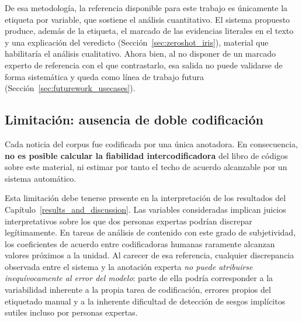 De esa metodología, la referencia disponible para este trabajo es únicamente la
etiqueta por variable, que sostiene el análisis cuantitativo. El sistema propuesto
produce, además de la etiqueta, el marcado de las evidencias literales en el texto
y una explicación del veredicto (Sección~\ref{sec:zeroshot_iris}), material que
habilitaría el análisis cualitativo. Ahora bien, al no disponer de un marcado
experto de referencia con el que contrastarlo, esa salida no puede validarse de
forma sistemática y queda como línea de trabajo futura
(Sección~\ref{sec:futurework_usecases}).

\subsection{Limitación: ausencia de doble codificación}
\label{subsec:limitacion_fiabilidad}

Cada noticia del corpus fue codificada por una única anotadora. En consecuencia,
\textbf{no es posible calcular la fiabilidad intercodificadora} del libro de
códigos sobre este material, ni estimar por tanto el techo de acuerdo alcanzable
por un sistema automático.

Esta limitación debe tenerse presente en la interpretación de los resultados del
Capítulo~\ref{results_and_discussion}. Las variables consideradas implican
juicios interpretativos sobre los que dos personas expertas podrían discrepar
legítimamente. En tareas de análisis de contenido con este grado de
subjetividad, los coeficientes de acuerdo entre codificadoras humanas raramente
alcanzan valores próximos a la unidad. Al carecer de esa referencia, cualquier
discrepancia observada entre el sistema y la anotación experta \emph{no puede
atribuirse inequívocamente al error del modelo}: parte de ella podría
corresponder a la variabilidad inherente a la propia tarea de codificación, errores propios del etiquetado manual y a la inherente dificultad de detección de sesgos implícitos sutiles incluso por personas expertas.

